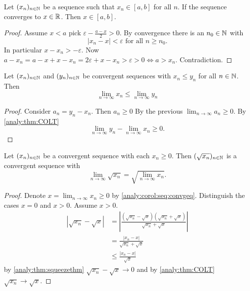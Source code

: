 \documentclass[10pt, a4paper]{article}
\newcommand{\seq}[1][x]{(#1_n)_{n \in \N}}
\begin{document}
\begin{theorem}\label{analy:thm:contofsqrt}
    Let $\seq$ be a sequence such that $x_n \in [a, b]$ for all $n$.
    If the sequence converges to $x \in \mathbb{R}$.
    Then $x \in [a, b]$.
    \begin{proof}
        Assume $x < a$ pick $\varepsilon - \frac{a - x}{2} > 0$.
        By convergence there is an $n_0 \in \mathbb{N}$ with
        \[
        |x_n - x| < \varepsilon \text{ for all } n \geq n_0.
        \]
        In particular
        $x - x_n > - \varepsilon$.
        Now $a - x_n = a - x + x - x_n = 2\varepsilon + x - x_n > \varepsilon > 0 \iff a > x_n$.
        Contradiction.
    \end{proof}
\end{theorem}

\begin{corollary}\label{analy:corol:seq:convgeq}
    Let $\seq$ and $\seq[y]$ be convergent sequences with $x_n \leq y_n$ for all $n \in \mathbb{N}$.
    Then
    \[
    \lim_{n \rightarrow \infty}x_n \leq \lim_{n \rightarrow \infty}y_n
    \]
    \begin{proof}
        Consider $a_n = y_n - x_n$.
        Then $a_n \geq 0$
        By the previous $\lim_{n \rightarrow \infty}a_n \geq 0$. By \autoref{analy:thm:COLT}
        \[
        \lim_{n \rightarrow \infty}y_n - \lim_{n \rightarrow \infty}x_n \geq 0.
        \]
    \end{proof}
\end{corollary}
\begin{theorem}
    Let $\seq$ be a convergent sequence with each $x_n \geq 0$.
    Then
    $(\sqrt{x_n})_{n \in \mathbb{N}}$ is a convergent sequence with
    \[
    \lim_{n \rightarrow \infty}\sqrt{x_n} = \sqrt{\lim_{n \rightarrow \infty}x_n}.
    \]
    \begin{proof}
        Denote $x = \lim_{n \rightarrow \infty}x_n \geq 0$ by \autoref{analy:corol:seq:convgeq}.
        Distinguish the cases $x = 0$ and $x > 0$.
        Assume $x > 0$.
        \begin{align*}
            |\sqrt{x_n} - \sqrt{x}| &= \left|\frac{(\sqrt{x_n} - \sqrt{x})(\sqrt{x_n} + \sqrt{x})}{\sqrt{x_n} + \sqrt{x}}\right| \\
            &= \frac{|x_n - x|}{\sqrt{x_n} + \sqrt{x}} \\
            &\leq \frac{|x_n - x|}{\sqrt{x}}
        \end{align*}
        by \autoref{analy:thm:squeezethm} $\sqrt{x_n} - \sqrt{x} \rightarrow 0$ and by \autoref{analy:thm:COLT} $\sqrt{x_n} \rightarrow \sqrt{x}$.
    \end{proof}
\end{theorem}
\end{document}
